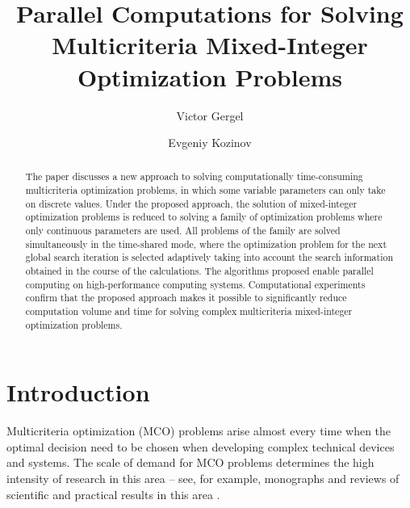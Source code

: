 \documentclass{svproc}
\begin{document}
\title{Parallel Computations for Solving Multicriteria Mixed-Integer Optimization Problems}

\author{Victor Gergel \and Evgeniy Kozinov}


\maketitle              %


\begin{abstract}
The paper discusses a new approach to solving computationally time-consuming multicriteria optimization problems, in which some variable parameters can only take on discrete values. Under the proposed approach, the solution of mixed-integer optimization problems is reduced to solving a family of optimization problems where only continuous parameters are used. All problems of the family are solved simultaneously in the time-shared mode, where the optimization problem for the next global search iteration is selected adaptively taking into account the search information obtained in the course of the calculations. The algorithms proposed enable parallel computing on high-performance computing systems. Computational experiments confirm that the proposed approach makes it possible to significantly reduce computation volume and time for solving complex multicriteria mixed-integer optimization problems.
\end{abstract}


\section{Introduction}\label{sec:1}

Multicriteria optimization (MCO) problems arise almost every time when the optimal decision need to be chosen when developing complex technical devices and systems. The scale of demand for MCO problems determines the high intensity of research in this area -- see, for example, monographs \cite{c1,c2,c3,c4,c5} and reviews of scientific and practical results in this area \cite{c6,c7,c8,c9}.
\end{document}
